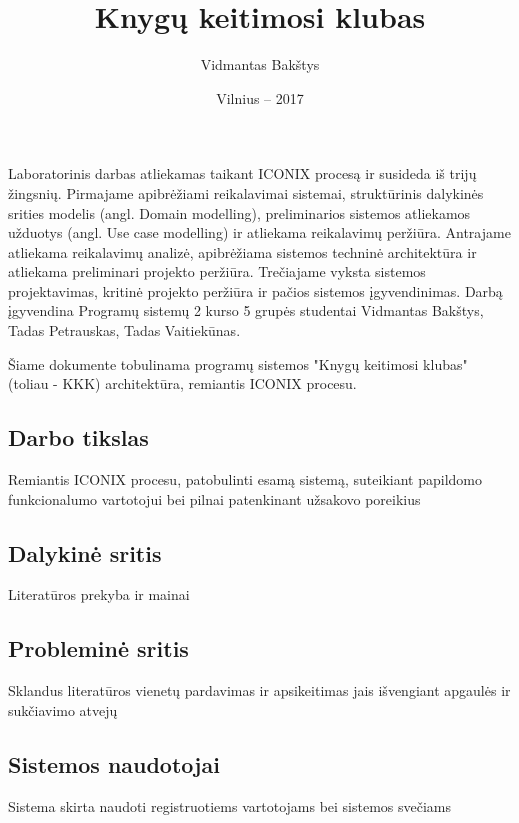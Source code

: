 \documentclass{VUMIFPSkursinis}
\title{Knygų keitimosi klubas}
\author{Vidmantas Bakštys}
\date{Vilnius – 2017}
\begin{document}
\maketitle

\setcounter{tocdepth}{2}

\tableofcontents
{} 

\setcounter{secnumdepth}{0}

Laboratorinis darbas atliekamas taikant ICONIX procesą ir susideda iš trijų žingsnių. 
Pirmajame apibrėžiami reikalavimai sistemai, struktūrinis dalykinės srities modelis (angl. Domain modelling), 
preliminarios sistemos atliekamos užduotys (angl. Use case modelling) ir atliekama reikalavimų peržiūra. 
Antrajame atliekama reikalavimų analizė, apibrėžiama sistemos techninė architektūra ir atliekama preliminari projekto peržiūra.
Trečiajame vyksta sistemos projektavimas, kritinė projekto peržiūra ir pačios sistemos įgyvendinimas.
Darbą įgyvendina Programų sistemų 2 kurso 5 grupės studentai Vidmantas Bakštys, Tadas Petrauskas, Tadas Vaitiekūnas.

Šiame dokumente tobulinama programų sistemos "Knygų keitimosi klubas" (toliau - KKK) architektūra, remiantis ICONIX procesu.

\subsection{Darbo tikslas}
Remiantis ICONIX procesu, patobulinti esamą sistemą, suteikiant papildomo funkcionalumo vartotojui bei pilnai patenkinant užsakovo poreikius

\subsection{Dalykinė sritis}
Literatūros prekyba ir mainai

\subsection{Probleminė sritis}
Sklandus literatūros vienetų pardavimas ir apsikeitimas jais išvengiant apgaulės ir sukčiavimo atvejų

\subsection{Sistemos naudotojai}
Sistema skirta naudoti registruotiems vartotojams bei sistemos svečiams
\end{document}
